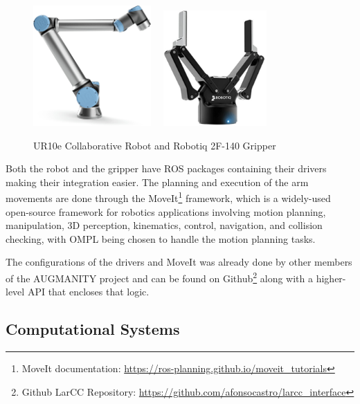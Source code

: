 \begin{figure}[ht]
    \centerline{\includegraphics[width=0.4\textwidth]{figs/UR10e.jpg} \ \ \includegraphics[width=0.35\textwidth]{figs/robotiq-2f-140.jpg}}
    \caption[UR10e Collaborative Robot and Robotiq 2F-140 Gripper]{UR10e Collaborative Robot \cite{UR10e_image} and Robotiq 2F-140 Gripper \cite{robotiq_gripper}}
    \label{fig:ur10e}
\end{figure}

Both the robot and the gripper have ROS packages containing their drivers making their integration easier. The planning and execution of the arm movements are done through the MoveIt\footnote{MoveIt documentation: \url{https://ros-planning.github.io/moveit_tutorials}} framework, which is a widely-used open-source framework for robotics applications involving motion planning, manipulation, 3D perception, kinematics, control, navigation, and collision checking, with OMPL being chosen to handle the motion planning tasks.

The configurations of the drivers and MoveIt was already done by other members of the AUGMANITY project and can be found on Github\footnote{Github LarCC Repository: \url{https://github.com/afonsocastro/larcc_interface}} along with a higher-level API that encloses that logic.

\subsection{Computational Systems}

